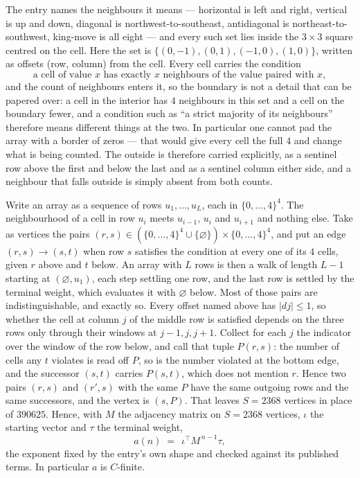 \documentclass[11pt,a4paper]{article}
\theoremstyle{plain}
\theoremstyle{definition}
\begin{document}
The entry names the neighbours it means --- horizontal is left and right, vertical is up and
down, diagonal is northwest-to-southeast, antidiagonal is northeast-to-southwest, king-move is
all eight --- and every such set lies inside the $3\times3$ square centred on the cell. Here
the set is $\{(0,-1), (0,1), (-1,0), (1,0)\}$, written as offsets (row, column) from the cell. Every cell carries
the condition
\[
\text{a cell of value }x\text{ has exactly }x\text{ neighbours of the value paired with }x,
\]
and the count of neighbours enters it, so the boundary is not a detail that can be papered
over: a cell in the interior has $4$ neighbours in this set and a cell on the boundary
fewer, and a condition such as ``a strict majority of its neighbours'' therefore means
different things at the two. In particular one cannot pad the array with a border of zeros ---
that would give every cell the full $4$ and change what is being counted. The outside is
therefore carried
explicitly, as a sentinel row above the first and below the last and as a sentinel column
either side, and a neighbour that falls outside is simply absent from both counts.

Write an array as a sequence of rows $u_1,\dots,u_L$, each in
$\{0,\dots,4\}^{4}$. The neighbourhood of a cell in row $u_i$ meets $u_{i-1}$,
$u_i$ and $u_{i+1}$ and nothing else. Take as vertices the pairs
$(r,s)\in(\{0,\dots,4\}^{4}\cup\{\varnothing\})\times\{0,\dots,4\}^{4}$,
and put an edge $(r,s)\to(s,t)$ when row $s$ satisfies the condition at every one of its
$4$ cells, given $r$ above and $t$ below. An array with $L$ rows is then a walk of length
$L-1$ starting at $(\varnothing,u_1)$, each step settling one row, and the last row is
settled by the terminal weight, which evaluates it with $\varnothing$ below. Most of those pairs are indistinguishable, and exactly so. Every offset named above has $|dj|\le 1$, so whether the cell at column $j$ of the middle row is satisfied depends on the three rows only through their windows at $j-1,j,j+1$. Collect for each $j$ the indicator over the window of the row below, and call that tuple $P(r,s)$: the number of cells any $t$ violates is read off $P$, so is the number violated at the bottom edge, and the successor $(s,t)$ carries $P(s,t)$, which does not mention $r$. Hence two pairs $(r,s)$ and $(r',s)$ with the same $P$ have the same outgoing rows and the same successors, and the vertex is $(s,P)$. That leaves $S=2368$ vertices in place of $390625$. Hence,
with $M$ the adjacency matrix on $S=2368$ vertices, $\iota$ the starting vector and $\tau$ the
terminal weight,
\[
a(n)\;=\;\,\iota^{\!\top}M^{\,n-1}\tau ,
\]
the exponent fixed by the entry's own shape and checked against its published terms. In
particular $a$ is $C$-finite.
\end{document}
